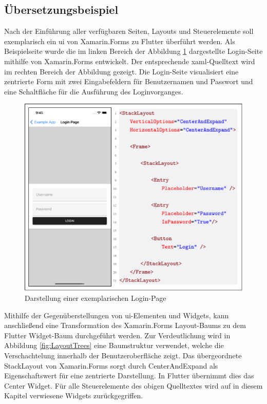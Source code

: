 \subsection{Übersetzungsbeispiel}
Nach der Einführung aller verfügbaren Seiten,  Layouts und Steuerelemente soll exemplarisch ein \ac{ui} von Xamarin.Forms zu Flutter überführt werden.  Als Beispielseite wurde die im linken Bereich der Abbildung \ref{fig:ExamplePage} dargestellte Login-Seite mithilfe von Xamarin.Forms entwickelt.  Der entsprechende \ac{xaml}-Quelltext wird im rechten Bereich der Abbildung gezeigt.  Die Login-Seite visualisiert eine zentrierte Form mit zwei Eingabefeldern für Benutzernamen und Passwort und eine Schaltfläche für die Ausführung des Loginvorganges.  


\begin{figure}[!ht]
 \includegraphics[width=\textwidth,height=\textheight,keepaspectratio]{Images/CrossPlattformFrameworks/ExamplePage.png}
 \caption{Darstellung einer exemplarischen Login-Page}
 \label{fig:ExamplePage}
\end{figure}

Mithilfe der Gegenüberstellungen von \ac{ui}-Elementen und Widgets,  kann anschließend eine Transformation des Xamarin.Forms Layout-Baums zu dem Flutter Widget-Baum durchgeführt werden.  Zur Verdeutlichung wird in Abbildung \ref{fig:LayoutTrees} eine Baumstruktur verwendet,  welche die Verschachtelung innerhalb der Benutzeroberfläche zeigt.  Das übergeordnete \glq StackLayout\grq{} von Xamarin.Forms sorgt durch \glq CenterAndExpand\grq{}  als Eigenschaftswert für eine zentrierte Darstellung.  In Flutter übernimmt dies das \glq Center\grq{} Widget.  Für alle  Steuerelemente des obigen Quelltextes wird auf in diesem Kapitel verwiesene Widgets zurückgegriffen. 

